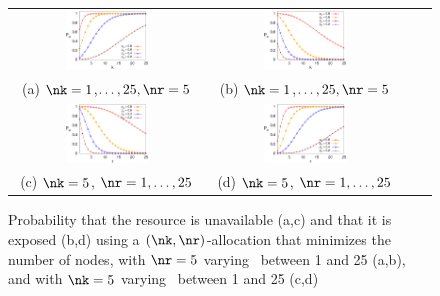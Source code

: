 \begin{figure}[t]
	\centering
	\hspace*{-25pt}
	\setlength{\tabcolsep}{20pt}
	\begin{tabular}{cccc}
		\includegraphics[width=0.45\textwidth]{figures/bdfprs-fig07a} & 
		\includegraphics[width=0.45\textwidth]{figures/bdfprs-fig07b} \\[3pt]
		\footnotesize{\hspace{20pt}(a) $\nk=1$,$\ldots,25, \nr=5$} &
		\footnotesize{\hspace{20pt}(b) $\nk=1$,$\ldots,25, \nr=5$} \\[20pt]  
		\includegraphics[width=0.45\textwidth]{figures/bdfprs-fig07c} &
		\includegraphics[width=0.45\textwidth]{figures/bdfprs-fig07d} \\[3pt]
		\footnotesize{\hspace{20pt}(c)  $\nk=5$, $\nr=1,\ldots,25$} &
		\footnotesize{\hspace{20pt}(d) $\nk=5$, $\nr=1,\ldots,25$} \\[20pt]
	\end{tabular}
	\caption{\label{dcs:fig:kompact} Probability that the resource is
		unavailable (a,c) and that it is exposed (b,d) using a
		$(\nk,\nr)$-allocation that minimizes the number of nodes, with
		$\nr=5$ varying \nk\ between 1 and 25 (a,b), and with $\nk=5$
		varying \nr\ between 1 and 25 (c,d)}
\end{figure}

